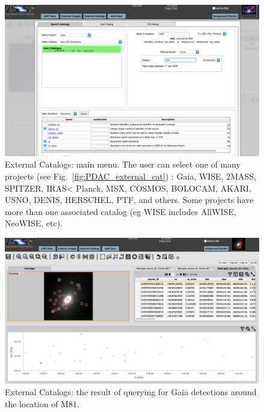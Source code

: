 \documentclass[DM,lsstdraft,toc]{lsstdoc}
\begin{document}
\begin{figure}
\includegraphics[width=\textwidth]{figs/external_catalogs_menu.png}
\caption{External Catalogs:  main menu. The user can select one of many projects (see Fig.~\ref{fig:PDAC_external_cat}) : Gaia, WISE, 2MASS, SPITZER, IRAS< Planck, MSX, COSMOS, BOLOCAM, AKARI, USNO, DENIS, HERSCHEL, PTF, and others. Some projects have more than one associated catalog (eg WISE includes AllWISE, NeoWISE, etc). }
\label{fig:ext_catalogs}
\end{figure}


\begin{figure}
\includegraphics[width=\textwidth]{figs/external_catalogs_m81.png}
\caption{External Catalogs:  the result of querying for Gaia detections around  the location of M81. }
\label{fig:ext_catalogs_m81}
\end{figure}
\end{document}
